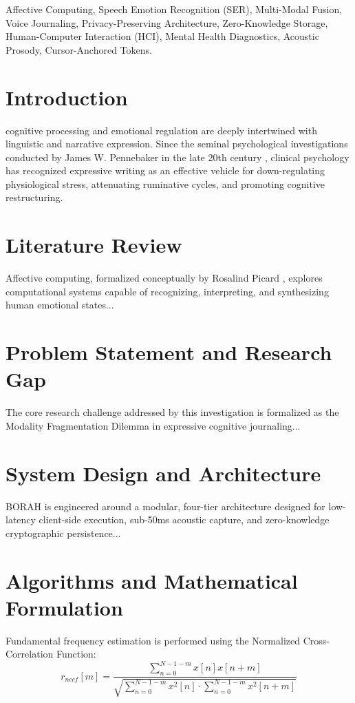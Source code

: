 \documentclass[journal,10pt,twocolumn]{IEEEtran}
\begin{document}
\begin{IEEEkeywords}
Affective Computing, Speech Emotion Recognition (SER), Multi-Modal Fusion, Voice Journaling, Privacy-Preserving Architecture, Zero-Knowledge Storage, Human-Computer Interaction (HCI), Mental Health Diagnostics, Acoustic Prosody, Cursor-Anchored Tokens.
\end{IEEEkeywords}

\section{Introduction}
 cognitive processing and emotional regulation are deeply intertwined with linguistic and narrative expression. Since the seminal psychological investigations conducted by James W. Pennebaker in the late 20th century \cite{pennebaker1997writing}, clinical psychology has recognized expressive writing as an effective vehicle for down-regulating physiological stress, attenuating ruminative cycles, and promoting cognitive restructuring.

\section{Literature Review}
Affective computing, formalized conceptually by Rosalind Picard \cite{picard1997affective}, explores computational systems capable of recognizing, interpreting, and synthesizing human emotional states...

\section{Problem Statement and Research Gap}
The core research challenge addressed by this investigation is formalized as the Modality Fragmentation Dilemma in expressive cognitive journaling...

\section{System Design and Architecture}
BORAH is engineered around a modular, four-tier architecture designed for low-latency client-side execution, sub-50ms acoustic capture, and zero-knowledge cryptographic persistence...

\section{Algorithms and Mathematical Formulation}
Fundamental frequency estimation is performed using the Normalized Cross-Correlation Function:
\begin{equation}
r_{nccf}[m] = \frac{\sum_{n=0}^{N-1-m} x[n] x[n+m]}{\sqrt{\sum_{n=0}^{N-1-m} x^2[n] \cdot \sum_{n=0}^{N-1-m} x^2[n+m]}}
\end{equation}
\end{document}
